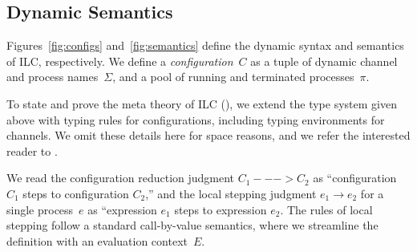 \begin{comment}
The fork rule says that that if we can appropriately split the affine context
such that the child process $e_1$ has type $A$ and mode $m_1$ and the
``continue'' process $e_2$ has type $B$ and mode $m_2$, then the whole
expression has type $B$ and mode $m_3$, which is derived by composing $m_1$ and
$m_2$ in parallel. Again, we emphasize that composing two write mode processes
in parallel violates type checking, i.e., $\Wm ;; \Wm => p$ cannot be derived
for any mode $p$.

Finally, the choice rule says that if we can appropriately split the affine
context such that both subexpressions $A$ and mode $R$, then the whole
expression follows exactly.

\paragraph{Affine rules.} The affine typing rules are, for the most part, analagous to their
intuitionistic counterparts. Two differences bear mentioning. First, the bang!
rule only lifts intuitionistically typed expressions that are closed with
respect to affine variables into an affinely typed expression. Otherwise, one
could wrap an intuitionistically typed expression with free affine variables in
a bang! and use it in an unrestricted manner. Second, in contrast with the abs
rule, the lollipop rule does not require function bodies to be free with respect
to affine variables.
\end{comment}

\subsection{Dynamic Semantics}
\label{subsec:semantics}

Figures~\ref{fig:configs} and~\ref{fig:semantics} define the dynamic syntax and semantics of ILC, respectively.
%
We define a \emph{configuration}~$C$ as a tuple of dynamic channel and process names~$\Sigma$, 
and a pool of running and terminated processes~$\pi$.

To state and prove the meta theory of ILC (), we
extend the type system given above with typing rules for
configurations, including typing environments for channels. 
%
We omit these details here for space reasons, 
and we refer the interested reader to .

We read the configuration reduction judgment $C_1 ---> C_2$ as ``configuration
$C_1$ steps to configuration $C_2$,'' 
%
and the local stepping judgment $e_1 \longrightarrow e_2$ for a single process~$e$ as
``expression $e_1$ steps to expression $e_2$.
%
The rules of local stepping follow a standard call-by-value semantics, 
where we streamline the definition with an evaluation context~$E$.

